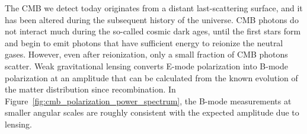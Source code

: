 The CMB we detect today originates from a distant last-scattering surface, and it has been altered during the subsequent history of the universe.
CMB photons do not interact much during the so-called cosmic dark ages, until the first stars form and begin to emit photons that have sufficient energy to reionize the neutral gases.
However, even after reionization, only a small fraction of CMB photons scatter.
Weak gravitational lensing converts E-mode polarization into B-mode polarization at an amplitude that can be calculated from the known evolution of the matter distribution since recombination. 
In Figure~\ref{fig:cmb_polarization_power_spectrum}, the B-mode measurements at smaller angular scales are roughly consistent with the expected amplitude due to lensing.

